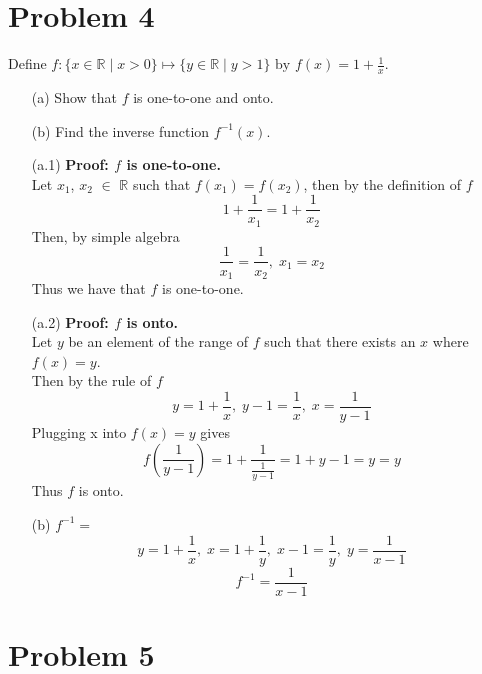 \documentclass[12pt]{article}
\begin{document}
\section*{Problem 4}

\begin{tcolorbox}[colback=gray!10, colframe=black, title=Given]
	Define \( f : \{x\in \mathbb{R} \mid x>0\} \mapsto \{y\in \mathbb{R} \mid y>1\}\text{ by }f(x)=1+\frac{1}{x}\).
	\begin{enumerate}
		\item [(a)] Show that $f$ is one-to-one and onto.
		\item [(b)] Find the inverse function $f^{-1}(x)$.
	\end{enumerate}
\end{tcolorbox}

\begin{tcolorbox}[colback=yellow!20, colframe=black, title=Solution]
	\begin{enumerate}
		\item [(a.1)] \textbf{Proof: $f$ is one-to-one.}
		      \\Let $x_1$, $x_2$ $\in$ $\mathbb{R}$ such that \( f(x_1)=f(x_2) \), then by the definition of $f$
		      \[ 1 + \frac{1}{x_1} = 1 + \frac{1}{x_2} \]
		      Then, by simple algebra
		      \[ \frac{1}{x_1}=\frac{1}{x_2}, \; x_1=x_2 \]
		      Thus we have that $f$ is one-to-one.
		\item [(a.2)] \textbf{Proof: $f$ is onto.}
		      \\Let $y$ be an element of the range of $f$ such that there exists an $x$ where $f(x)=y$.
		      \\Then by the rule of $f$
		      \[y=1+\frac{1}{x},\; y-1=\frac{1}{x},\; x=\frac{1}{y-1} \]
		      Plugging x into $f(x)=y$ gives
		      \[f(\frac{1}{y-1})=1+\frac{1}{\frac{1}{y-1}}=1+y-1=y=y \]
		      Thus $f$ is onto.
		\item [(b)] $f^{-1}=$
		      \[y=1+\frac{1}{x},\; x=1+\frac{1}{y},\; x-1=\frac{1}{y},\; y=\frac{1}{x-1}\]
		      \[f^{-1}=\frac{1}{x-1}\]
	\end{enumerate}
\end{tcolorbox}
\section*{Problem 5}
\end{document}
